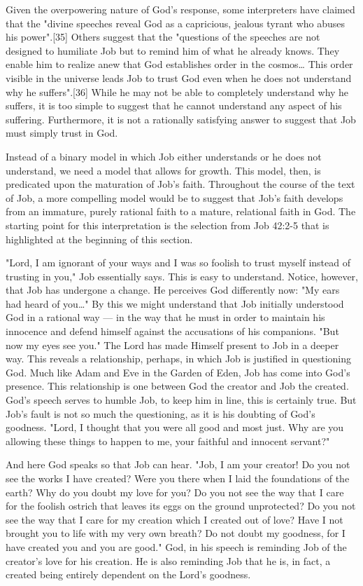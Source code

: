 Given the overpowering nature of God's response, some interpreters have claimed that the "divine speeches reveal God as a capricious, jealous tyrant who abuses his power".[35] Others suggest that the "questions of the speeches are not designed to humiliate Job but to remind him of what he already knows. They enable him to realize anew that God establishes order in the cosmos… This order visible in the universe leads Job to trust God even when he does not understand why he suffers".[36] While he may not be able to completely understand why he suffers, it is too simple to suggest that he cannot understand any aspect of his suffering. Furthermore, it is not a rationally satisfying answer to suggest that Job must simply trust in God.

Instead of a binary model in which Job either understands or he does not understand, we need a model that allows for growth. This model, then, is predicated upon the maturation of Job's faith. Throughout the course of the text of Job, a more compelling model would be to suggest that Job's faith develops from an immature, purely rational faith to a mature, relational faith in God. The starting point for this interpretation is the selection from Job 42:2-5 that is highlighted at the beginning of this section.

"Lord, I am ignorant of your ways and I was so foolish to trust myself instead of trusting in you," Job essentially says. This is easy to understand. Notice, however, that Job has undergone a change. He perceives God differently now: "My ears had heard of you…" By this we might understand that Job initially understood God in a rational way — in the way that he must in order to maintain his innocence and defend himself against the accusations of his companions. "But now my eyes see you." The Lord has made Himself present to Job in a deeper way. This reveals a relationship, perhaps, in which Job is justified in questioning God. Much like Adam and Eve in the Garden of Eden, Job has come into God's presence. This relationship is one between God the creator and Job the created. God's speech serves to humble Job, to keep him in line, this is certainly true. But Job's fault is not so much the questioning, as it is his doubting of God's goodness. "Lord, I thought that you were all good and most just. Why are you allowing these things to happen to me, your faithful and innocent servant?"

And here God speaks so that Job can hear. "Job, I am your creator! Do you not see the works I have created? Were you there when I laid the foundations of the earth? Why do you doubt my love for you? Do you not see the way that I care for the foolish ostrich that leaves its eggs on the ground unprotected? Do you not see the way that I care for my creation which I created out of love? Have I not brought you to life with my very own breath? Do not doubt my goodness, for I have created you and you are good." God, in his speech is reminding Job of the creator's love for his creation. He is also reminding Job that he is, in fact, a created being entirely dependent on the Lord's goodness.

